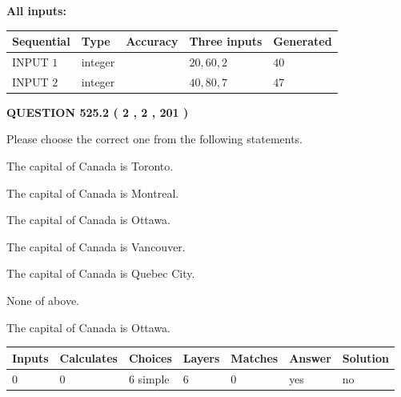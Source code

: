 \documentclass[12pt]{article}
\begin{document}
   
   
   
\noindent\vspace{0.1in}\hspace{-0.08in} {\textbf{\Large{All inputs: }}}
   
   
  
  
\noindent\begin{tabular}{|l|l|l|l|l|}
\hline
 Sequential & Type & Accuracy & Three inputs & Generated \\ 
\hline
 
 
  INPUT $  1 $ & integer &  & $
 20
 , 
 60
 , 
 2
 $ & $ 40 $ 
 \\  \hline  
 
 
  INPUT $  2 $ & integer &  & $
 40
 , 
 80
 , 
 7
 $ & $ 47 $ 
 \\  \hline  
 \end{tabular}
   
   
  
\vspace{0.2in}
  
{\textbf{\Large{QUESTION
525.2 
 ( 2 , 2 , 201 )
}}}
  
  
Please choose the correct one from the following statements.
 
 
The capital of Canada is Toronto.
 
 
The capital of Canada is Montreal.
 
 
The capital of Canada is Ottawa.
 
 
The capital of Canada is Vancouver.
 
 
The capital of Canada is Quebec City.
 
 
 None of above.
 
 
\noindent{}
 
 
The capital of Canada is Ottawa.
 
 
\noindent{}
 
 
   
   
   
   
\noindent\begin{tabular}{|l|l|l|l|l|l|l|}
 \hline
Inputs & Calculates & Choices & Layers & Matches & Answer & Solution \\ \hline
 0  & 
 0  & 
 6
  simple  
  & 
 6  & 
 0  & 
  yes & 
  no 
  \\ \hline
 \end{tabular}
   
\end{document}
